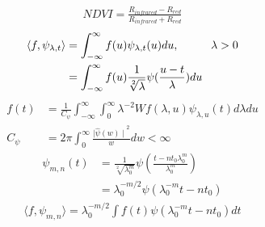 \documentclass{article}
\newcommand\tab[1][1cm]{\hspace*{#1}}
\begin{document}
\begin{align}
NDVI=\frac{R_{infrared}- R_{red}}{R_{infrared} + R_{red}}
\end{align}
\begin{align}
\langle f, \psi_{\lambda,{t}} \rangle&= \int_{-\infty}^{\infty}{f(u)}\psi_{\lambda,t}(u)du,\tab{\lambda>0}\\
&=\int_{-\infty}^{\infty}{f(u)}\frac{1}{\sqrt[2]{\lambda}}\psi(\frac{u-t}{\lambda}) du
\end{align}
\begin{align}
f(t)&=\frac{1}{C_{\psi}}\int_{-\infty}^{\infty}\int_{0}^{\infty} \lambda^{-2}Wf(\lambda,u)\psi_{\lambda,u}(t)d\lambda du\\
C_{\psi}&=2\pi\int_{0}^{\infty}\frac{{\mid \hat{\psi}(w) \mid}^{2}}{w}dw<\infty
\end{align}
\begin{align}
\psi_{m,n}(t)&=\frac{1}{\sqrt[2]{\lambda_{0}^{m}}}\psi(\frac{t-nt_{0}\lambda_{0}^{m}}{\lambda_{0}^{m}})\\
&=\lambda_{0}^{-m/2}\psi(\lambda_{0}^{-m}t-nt_{0})
\end{align}
\begin{align}
\langle f, \psi_{m,n} \rangle = \lambda_{0}^{-m/2}\int f(t)\psi(\lambda_{0}^{-m}t-nt_{0})dt
\end{align}
\end{document}
